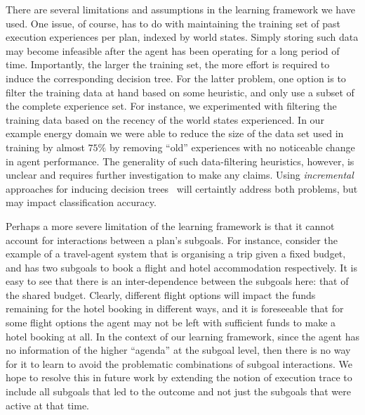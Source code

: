 There are several limitations and assumptions in the learning framework we have used.
One issue, of course, has to do with maintaining the training set of past execution experiences per plan, indexed by world states. Simply storing such data may become infeasible after the agent has been operating for a long period of time. Importantly, the larger the training set, the more effort is required to induce the corresponding decision tree. For the latter problem, one option is to filter the training data at hand based on some heuristic, and only use a subset of the complete experience set. For instance, we experimented with filtering the training data based on the recency of the world states experienced. In our example energy domain we were able to reduce the size of the data set used in training by almost $75\%$ by removing ``old'' experiences with no noticeable change in agent performance. The generality of such data-filtering heuristics, however, is unclear and requires further investigation to make any claims. Using \emph{incremental} approaches for inducing decision trees~\cite{Swere06:Fast,Utgoff97Decision} will certaintly address both problems, but may impact classification accuracy.

Perhaps a more severe limitation of the learning framework is that it cannot account for interactions between a plan's subgoals. For instance, consider the example of a travel-agent system that is organising a trip given a fixed budget, and has two subgoals to book a flight and hotel accommodation respectively. It is easy to see that there is an inter-dependence between the subgoals here:  that of the shared budget. Clearly, different flight options will impact the funds remaining for the hotel booking in different ways, and it is foreseeable that for some flight options the agent may not be left with sufficient funds to make a hotel booking at all. In the context of our learning framework, since the  agent has no information of the higher ``agenda'' at the subgoal level, then there is no way for it to learn to avoid the problematic combinations of subgoal interactions. We hope to resolve this in future work by extending the notion of execution trace to include all subgoals that led to the outcome and not just the subgoals that were active at that time.

